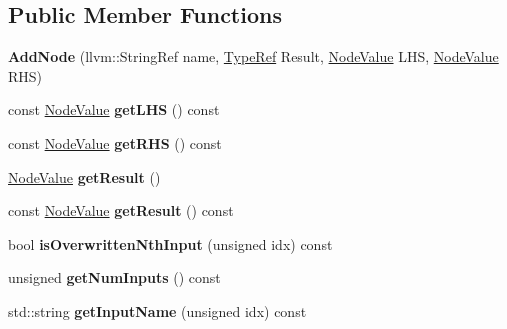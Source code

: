 \subsection*{Public Member Functions}
\begin{DoxyCompactItemize}
\item 
\mbox{\label{classglow_1_1_add_node_abaec9c7de554eff2902a942de943fe1e}} 
{\bfseries Add\+Node} (llvm\+::\+String\+Ref name, \hyperlink{structglow_1_1_type}{Type\+Ref} Result, \hyperlink{structglow_1_1_node_value}{Node\+Value} L\+HS, \hyperlink{structglow_1_1_node_value}{Node\+Value} R\+HS)
\item 
\mbox{\label{classglow_1_1_add_node_a34fedba4a814d2978a9fb83a66ad6e8b}} 
const \hyperlink{structglow_1_1_node_value}{Node\+Value} {\bfseries get\+L\+HS} () const
\item 
\mbox{\label{classglow_1_1_add_node_a2233faf157d23efd88d30c3ba8a20095}} 
const \hyperlink{structglow_1_1_node_value}{Node\+Value} {\bfseries get\+R\+HS} () const
\item 
\mbox{\label{classglow_1_1_add_node_a9cdda34eee050c9a7c343eafd0e4bcd1}} 
\hyperlink{structglow_1_1_node_value}{Node\+Value} {\bfseries get\+Result} ()
\item 
\mbox{\label{classglow_1_1_add_node_a4c203ed89165fafd759e2d1029ed6824}} 
const \hyperlink{structglow_1_1_node_value}{Node\+Value} {\bfseries get\+Result} () const
\item 
\mbox{\label{classglow_1_1_add_node_a6a7c39184846a32ae1c18e551547b3ca}} 
bool {\bfseries is\+Overwritten\+Nth\+Input} (unsigned idx) const
\item 
\mbox{\label{classglow_1_1_add_node_addac1d29875762cbb5b117874b8b1554}} 
unsigned {\bfseries get\+Num\+Inputs} () const
\item 
\mbox{\label{classglow_1_1_add_node_a2eefb1158e5f0587665a681cf8e1c551}} 
std\+::string {\bfseries get\+Input\+Name} (unsigned idx) const
\item 
\mbox{\label{classglow_1_1_add_node_a4ef148b554986b15017aaccc5082f38d}} 

\end{DoxyCompactItemize}
